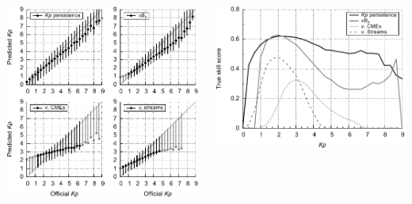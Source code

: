 \documentclass[11pt,aspectratio=1610]{beamer}	%
\newcommand{\captionoftiny}[2]{\captionof{#1}{\color{gray} \tiny #2}}
\begin{document}
\begin{frame}[c]{}{}
	\begin{columns}[c]
		
		\includegraphics[width=\textwidth]{../figures_of_mine/chapter2/model_performance_d.pdf}


		\includegraphics[width=\textwidth]{../figures_of_mine/chapter2/true_skill_score.pdf}
	
	\end{columns}
\end{frame}
\end{document}
